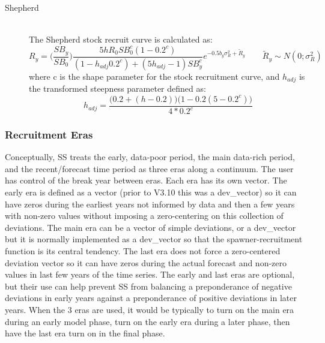 \begin{description}
	\item[Shepherd]\hfil\\
	The Shepherd stock recruit curve is calculated as:
	\begin{equation}
		R_y = \bigg(\frac{SB_y}{SB_0}\bigg)\frac{5hR_0SB^c_0(1-0.2^c)}{(1-h_{adj}0.2^c)+(5h_{adj}-1)SB^c_y}e^{-0.5b_y\sigma^2_R+\tilde{R}_y}\qquad \tilde{R}_y\sim N(0;\sigma^2_R)
	\end{equation}
	where c is the shape parameter for the stock recruitment curve, and $h_{adj}$ is the transformed steepness parameter defined as:
	\begin{equation}
		h_{adj}=\frac{\big(0.2+(h-0.2)\big)\big(1-0.2(5-0.2^c)\big)}{4*0.2^c}
	\end{equation}
\end{description}

\subsubsection{Recruitment Eras}
Conceptually, SS treats the early, data-poor period, the main data-rich period, and the recent/forecast time period as three eras along a continuum.  The user has control of the break year between eras.  Each era has its own vector.  The early era is defined as a vector (prior to V3.10 this was a dev\_vector) so it can have zeros during the earliest years not informed by data and then a few years with non-zero values without imposing a zero-centering on this collection of deviations.  The main era can be a vector of simple deviations, or a dev\_vector but it is normally implemented as a dev\_vector so that the spawner-recruitment function is its central tendency.  The last era does not force a zero-centered deviation vector so it can have zeros during the actual forecast and non-zero values in last few years of the time series.  The early and last eras are optional, but their use can help prevent SS from balancing a preponderance of negative deviations in early years against a preponderance of positive deviations in later years.  When the 3 eras are used, it would be typically to turn on the main era during an early model phase, turn on the early era during a later phase, then have the last era turn on in the final phase.

